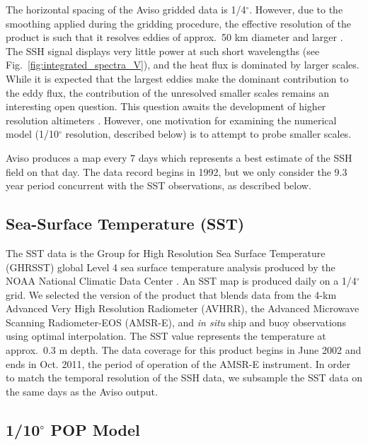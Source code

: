 \documentclass[10pt]{article}
\begin{document}
The horizontal spacing of the Aviso gridded data is 1/4$^\circ$. However, due to the smoothing applied during the gridding procedure, the effective resolution of the product is such that it resolves eddies of approx.~50 km diameter and larger \citep{CheltonEtAl2011}. The SSH signal displays very little power at such short wavelengths (see Fig.~\ref{fig:integrated_spectra_V}), and the heat flux is dominated by larger scales. While it is expected that the largest eddies make the dominant contribution to the eddy flux, the contribution of the unresolved smaller scales remains an interesting open question. This question awaits the development of higher resolution altimeters \citep{FuFerrari2008}. However, one motivation for examining the numerical model (1/10$^\circ$ resolution, described below) is to attempt to probe smaller scales.

Aviso produces a map every 7 days which represents a best estimate of the SSH field on that day. The data record begins in 1992, but we only consider the 9.3 year period concurrent with the SST observations, as described below.

\subsection{Sea-Surface Temperature (SST)}

The SST data is the Group for High Resolution Sea Surface Temperature (GHRSST) global Level 4 sea surface temperature analysis produced by the NOAA National Climatic Data Center \citep{ReynoldsEtAl2007}. An SST map is produced daily on a 1/4$^\circ$ grid. We selected the version of the product that blends data from the 4-km Advanced Very High Resolution Radiometer (AVHRR), the Advanced Microwave Scanning Radiometer-EOS (AMSR-E), and {\em in situ} ship and buoy observations using optimal interpolation. The SST value represents the temperature at approx.~0.3 m depth. The data coverage for this product begins in June 2002 and ends in Oct. 2011, the period of operation of the AMSR-E instrument. In order to match the temporal resolution of the SSH data, we subsample the SST data on the same days as the Aviso output.

\subsection{1/10$^\circ$ POP Model}
\end{document}
